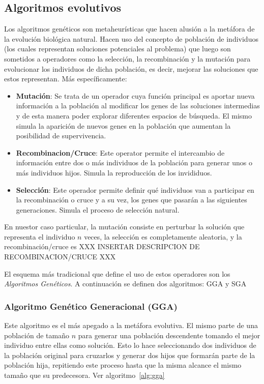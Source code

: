 \documentclass{ci5652}
\begin{document}
\subsection{Algoritmos evolutivos}
Los algoritmos genéticos son metaheurísticas que hacen alusión a la metáfora de la evolución biológica natural. Hacen uso del concepto de población de individuos (los cuales representan soluciones potenciales al problema) que luego son sometidos a operadores como la selección, la recombinación y la mutación para evolucionar los individuos de dicha población, es decir, mejorar las soluciones que estos representan. Más específicamente:

\begin{itemize}
\item \textbf{Mutación}: Se trata de un operador cuya función principal es aportar nueva información a la población al modificar los genes de las soluciones intermedias y de esta manera poder explorar diferentes espacios de búsqueda. El mismo simula la aparición de nuevos genes en la población que aumentan la posibilidad de supervivencia.

\item \textbf{Recombinacion/Cruce}: Este operator permite el intercambio de información entre dos o más individuos de la población para generar unos o más individuos hijos. Simula la reproducción de los invididuos.

\item \textbf{Selección}: Este operador permite definir qué individuos van a participar en la recombinación o cruce y a su vez, los genes que pasarán a las siguientes generaciones. Simula el proceso de selección natural.
\end{itemize}

En nuestor caso particular, la mutación consiste en perturbar la solución que representa el individuo $n$ veces, la selección es completamente aleatoria, y la recombinación/cruce es XXX INSERTAR DESCRIPCION DE RECOMBINACION/CRUCE XXX

El esquema más tradicional que define el uso de estos operadores son los \textit{Algoritmos Genéticos}. A continuación se definen dos algoritmos: GGA y SGA

\subsubsection{Algoritmo Genético Generacional (GGA)}

Este algoritmo es el más apegado a la metáfora evolutiva. El mismo parte de una población de tamaño $n$ para generar una población descendente tomando el mejor individuo entre ellas como solución. Esto lo hace seleccionando dos individuos de la población original para cruzarlos y generar dos hijos que formarán parte de la población hija, repitiendo este proceso hasta que la misma alcance el mismo tamaño que su predecesora. Ver algoritmo~\ref{alg:gga}
\end{document}
